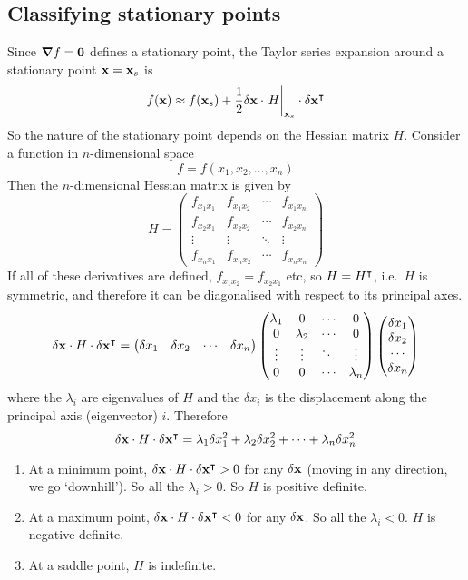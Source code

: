 \subsection{Classifying stationary points}
Since \(\grad f = \vb 0\) defines a stationary point, the Taylor series expansion around a stationary point \(\vb x = \vb x_s\) is
\[
	f(\vb x) \approx f(\vb x_s) + \frac{1}{2}\delta \vb x \cdot \eval{H}_{\vb x_s} \cdot \delta \vb x^\transpose
\]
So the nature of the stationary point depends on the Hessian matrix \(H\).
Consider a function in \(n\)-dimensional space
\[
	f = f(x_1, x_2, \dots, x_n)
\]
Then the \(n\)-dimensional Hessian matrix is given by
\[
	H = \begin{pmatrix}
		f_{x_1 x_1} & f_{x_1 x_2} & \cdots & f_{x_1 x_n} \\
		f_{x_2 x_1} & f_{x_2 x_2} & \cdots & f_{x_2 x_n} \\
		\vdots      & \vdots      & \ddots & \vdots      \\
		f_{x_n x_1} & f_{x_n x_2} & \cdots & f_{x_n x_n}
	\end{pmatrix}
\]
If all of these derivatives are defined, \(f_{x_1x_2} = f_{x_2x_1}\) etc, so \(H = H^\intercal\), i.e.\ \(H\) is symmetric, and therefore it can be diagonalised with respect to its principal axes.
\[
	\delta \vb x \cdot H \cdot \delta \vb x^\intercal = \begin{pmatrix}
		\delta x_1 & \delta x_2 & \cdots & \delta x_n
	\end{pmatrix} \begin{pmatrix}
		\lambda_1 & 0         & \cdots & 0         \\
		0         & \lambda_2 & \cdots & 0         \\
		\vdots    & \vdots    & \ddots & \vdots    \\
		0         & 0         & \cdots & \lambda_n
	\end{pmatrix} \begin{pmatrix}
		\delta x_1 \\ \delta x_2 \\ \cdots \\ \delta x_n
	\end{pmatrix}
\]
where the \(\lambda_i\) are eigenvalues of \(H\) and the \(\delta x_i\) is the displacement along the principal axis (eigenvector) \(i\).
Therefore
\[
	\delta \vb x \cdot H \cdot \delta \vb x^\intercal = \lambda_1 \delta x_1^2 + \lambda_2 \delta x_2^2 + \dots + \lambda_n \delta x_n^2
\]
\begin{enumerate}
	\item At a minimum point, \(\delta \vb x \cdot H \cdot \delta \vb x^\intercal > 0\) for any \(\delta \vb x\) (moving in any direction, we go `downhill').
	      So all the \(\lambda_i > 0\).
	      So \(H\) is positive definite.
	\item At a maximum point, \(\delta \vb x \cdot H \cdot \delta \vb x^\intercal < 0\) for any \(\delta \vb x\).
	      So all the \(\lambda_i < 0\).
	      \(H\) is negative definite.
	\item At a saddle point, \(H\) is indefinite.
\end{enumerate}

